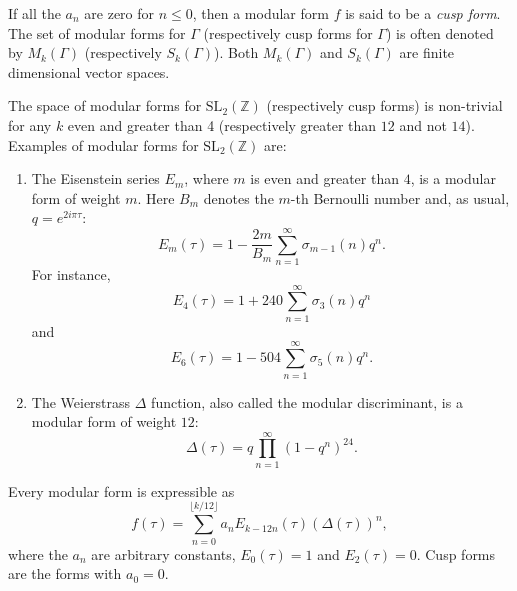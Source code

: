 \documentclass[12pt]{article}
\newcommand{\sldeuxz}{\textrm{SL}_{2}(\mathbb{Z})}
\begin{document}
If all the $a_n$ are zero for $n\le 0$, then a modular form $f$ is said to be a \emph{cusp form}.  The set of modular forms for $\Gamma$ (respectively cusp forms for $\Gamma$) is often denoted by $M_{k}(\Gamma)$ (respectively $S_{k}(\Gamma)$).  Both $M_{k}(\Gamma)$ and $S_{k}(\Gamma)$ are finite dimensional vector spaces.

The space of modular forms for $\sldeuxz$ (respectively cusp forms) is non-trivial for any $k$ even and greater than 4 (respectively greater than $12$ and not $14$).  Examples of modular forms for $\sldeuxz$ are:
\begin{enumerate}
\item The Eisenstein series $E_{m}$, where $m$ is even and greater than $4$, is a modular form of weight $m$.  Here $B_{m}$ denotes the $m$-th Bernoulli number and, as usual, $q=e^{2i\pi \tau}$:
\begin{equation}
E_{m}(\tau)=1-\frac{2m}{B_{m}}\underset{n=1}{\overset{\infty}{\sum}}\sigma_{m-
1}(n)q^n.
\end{equation}
For instance,
\begin{equation}
E_{4}(\tau)=1+240\underset{n=1}{\overset{\infty}{\sum}}\sigma_{3}(n)q^n
\end{equation}
and
\begin{equation}
E_{6}(\tau)=1-504\underset{n=1}{\overset{\infty}{\sum}}\sigma_{5}(n)q^n.
\end{equation}

\item The Weierstrass $\Delta$ function, also called the modular discriminant, is a modular form of weight $12$:
\begin{equation}
\Delta(\tau)=q\underset{n=1}{\overset{\infty}{\prod}}(1-q^n)^{24}.
\end{equation}
\end{enumerate}

Every modular form is expressible as
\begin{equation}
f(\tau)=\underset{n=0}{\overset{\lfloor{k/12}\rfloor}{\sum}}{a_n}{E_{k-12n}(\tau)}{(\Delta(\tau))^n},
\end{equation}
where the $a_n$ are arbitrary constants, $E_0(\tau)=1$ and $E_2(\tau)=0$.  Cusp forms are the forms with $a_0=0$.
\end{document}
